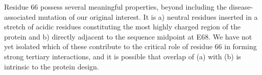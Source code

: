 \documentclass[10pt,letterpaper]{article}
\begin{document}
Residue 66 possess several meaningful properties, beyond including the disease-associated mutation of our original interest. It is a) neutral residues inserted in a stretch of acidic residues constituting the most highly charged region of the protein and b) directly adjacent to the sequence midpoint at E68.  We have not yet isolated which of these contribute to the critical role of residue 66 in forming strong tertiary interactions, and it is possible that overlap of (a) with (b) is intrinsic to the protein design.  







\end{document}
